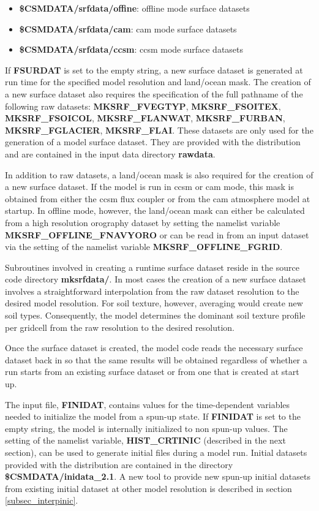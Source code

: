 \begin{center}
\begin{itemize}
\item {\bf \$CSMDATA/srfdata/offine}: offline mode surface datasets
\item {\bf \$CSMDATA/srfdata/cam}: cam mode surface datasets
\item {\bf \$CSMDATA/srfdata/ccsm}: ccsm mode surface datasets
\end{itemize}
\end{center}

\noindent If {\bf FSURDAT} is set to the empty string, a new surface dataset is
generated at run time for the specified model resolution and
land/ocean mask. The creation of a new surface dataset also requires
the specification of the full pathname of the following raw datasets:
{\bf MKSRF\_FVEGTYP}, {\bf MKSRF\_FSOITEX}, {\bf MKSRF\_FSOICOL}, {\bf
MKSRF\_FLANWAT}, {\bf MKSRF\_FURBAN}, {\bf MKSRF\_FGLACIER}, {\bf
MKSRF\_FLAI}.  These datasets are only used for the generation of a
model surface dataset. They are provided with the distribution and are
contained in the input data directory {\bf rawdata}.

In addition to raw datasets, a land/ocean mask is also required for
the creation of a new surface dataset. If the model is run in ccsm or
cam mode, this mask is obtained from either the ccsm flux coupler or
from the cam atmosphere model at startup.  In offline mode, however,
the land/ocean mask can either be calculated from a high resolution
orography dataset by setting the namelist variable {\bf
MKSRF\_OFFLINE\_FNAVYORO} or can be read in from an input dataset via
the setting of the namelist variable {\bf MKSRF\_OFFLINE\_FGRID}.

Subroutines involved in creating a runtime surface dataset reside in the
source code directory {\bf mksrfdata/}. In most cases the creation of a new
surface dataset involves a straightforward interpolation from the raw
dataset resolution to the desired model resolution. For soil texture,
however, averaging would create new soil types. Consequently, the
model determines the dominant soil texture profile per gridcell from
the raw resolution to the desired resolution. 

Once the surface dataset is created, the model code reads the necessary
surface dataset back in so that the same results will be obtained
regardless of whether a run starts from an existing surface dataset or
from one that is created at start up.

The input file, {\bf FINIDAT}, contains values for the time-dependent
variables needed to initialize the model from a spun-up state. If {\bf
FINIDAT} is set to the empty string, the model is internally
initialized to non spun-up values. The setting of the namelist
variable, {\bf HIST\_CRTINIC} (described in the next section), can be
used to generate initial files during a model run. Initial datasets
provided with the distribution are contained in the directory {\bf
\$CSMDATA/inidata\_2.1}. A new tool to provide new spun-up initial datasets
from existing initial dataset at other model resolution is described in
section \ref{subsec_interpinic}.

